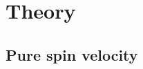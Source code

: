 \documentclass[prb,11pt,tightenlines,twocolumn,aps]{revtex4-1}
\begin{document}

\section{Theory} %
\label{sec:theory}




\subsection{Pure spin velocity} %
\label{sec:theory-pure_spin_current}
\end{document}
